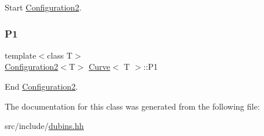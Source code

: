 Start {\ttfamily \mbox{\hyperlink{class_configuration2}{Configuration2}}}. 

\mbox{\label{class_curve_ab9eb1cded523a8de01c4514a4bf9e748}} 
\subsubsection{\texorpdfstring{P1}{P1}}
{\footnotesize\ttfamily template$<$class T$>$ \\
\mbox{\hyperlink{class_configuration2}{Configuration2}}$<$T$>$ \mbox{\hyperlink{class_curve}{Curve}}$<$ T $>$\+::P1\hspace{0.3cm}{\ttfamily [protected]}}



End {\ttfamily \mbox{\hyperlink{class_configuration2}{Configuration2}}}. 



The documentation for this class was generated from the following file\+:\begin{DoxyCompactItemize}
\item 
src/include/\mbox{\hyperlink{dubins_8hh}{dubins.\+hh}}\end{DoxyCompactItemize}
